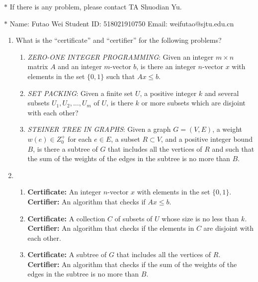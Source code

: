 \documentclass[12pt,a4paper]{article}
\makeatletter
\newtheorem*{solution}{Solution}
\theoremstyle{definition}
\renewenvironment{solution}[1][Solution] {\par\pushQED{\qed}\normalfont\topsep6\p@\@plus6\p@\relax\trivlist\item[\hskip\labelsep\bfseries#1\@addpunct{.}]\ignorespaces}{\popQED\endtrivlist\@endpefalse} \makeatother
\makeatother
\begin{document}
\noindent

\noindent{}
\begin{center}
\footnotesize{\color{red}$*$ If there is any problem, please contact TA Shuodian Yu. }

\footnotesize{\color{blue}$*$ Name: Futao Wei  \quad Student ID: 518021910750 \quad Email: weifutao@sjtu.edu.cn}
\end{center}
\begin{enumerate}
	\item What is the ``certificate'' and ``certifier'' for the following problems?
	\begin{enumerate}
		\item \emph{ZERO-ONE INTEGER PROGRAMMING}: Given an integer $m \times n$ matrix $A$ and an integer $m$-vector $b$, is there an integer $n$-vector $x$ with elements in the set $\{0, 1\}$ such that $Ax \leq b$.
		\item \emph{SET PACKING}: Given a finite set $U$, a positive integer $k$ and several subsets $U_1, U_2, \ldots, U_m$ of $U$, is there $k$ or more subsets which are disjoint with each other?
		\item \emph{STEINER TREE IN GRAPHS}: Given a graph $G=(V,E)$, a weight $w(e)\in Z_0^{+}$ for each $e\in E$, a subset $R \subset V$, and a positive integer bound $B$, is there a subtree of $G$ that includes all the vertices of $R$ and such that the sum of the weights of the edges in the subtree is no more than $B$.
	\end{enumerate}
	\begin{solution}
        \hfill
        \begin{enumerate}
        	\item 
        	\textbf{Certificate:} An integer $n$-vector $x$ with elements in the set $\{0, 1\}$. \\
        	\textbf{Certifier:} An algorithm that checks if $Ax \leq b$.
        	\item 
        	\textbf{Certificate:} A collection $C$ of subsets of $U$ whose size is no less than $k$. \\
        	\textbf{Certifier:} An algorithm that checks if the elements in $C$ are disjoint with each other.
        	\item 
        	\textbf{Certificate:} A subtree of $G$ that includes all the vertices of $R$. \\
        	\textbf{Certifier:} An algorithm that checks if the sum of the weights of the edges in the subtree is no more than $B$.
        	

\end{enumerate}
\end{solution}
\end{enumerate}
\end{document}
